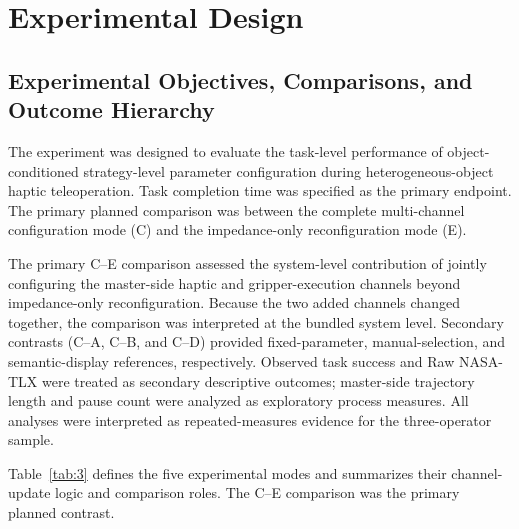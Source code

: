 \section{Experimental Design}
\subsection{Experimental Objectives, Comparisons, and Outcome Hierarchy}
The experiment was designed to evaluate the task-level performance of object-conditioned strategy-level parameter configuration during heterogeneous-object haptic teleoperation. Task completion time was specified as the primary endpoint. The primary planned comparison was between the complete multi-channel configuration mode (C) and the impedance-only reconfiguration mode (E).

The primary C--E comparison assessed the system-level contribution of jointly configuring the master-side haptic and gripper-execution channels beyond impedance-only reconfiguration. Because the two added channels changed together, the comparison was interpreted at the bundled system level. Secondary contrasts (C--A, C--B, and C--D) provided fixed-parameter, manual-selection, and semantic-display references, respectively. Observed task success and Raw NASA-TLX were treated as secondary descriptive outcomes; master-side trajectory length and pause count were analyzed as exploratory process measures. All analyses were interpreted as repeated-measures evidence for the three-operator sample.

Table~\ref{tab:3} defines the five experimental modes and summarizes their channel-update logic and comparison roles. The C--E comparison was the primary planned contrast.


